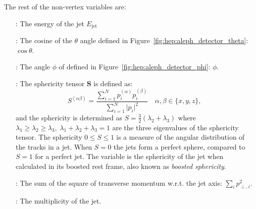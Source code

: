 \documentclass[a4paper, twoside, nobib]{tufte-book}
\newcommand{\abs}[1]{\lvert#1\rvert}
\newcommand{\code}[1]{\colorbox{light-gray}{\texttt{\detokenize{#1}}}}
\renewcommand{\vec}[1]{\mathbf{#1}}
\begin{document}


 


The rest of the non-vertex variables are: 

\begin{enumerate}
  \item[\hspace{0.5cm} \code{ejet}:] The energy of the jet $E_\mathrm{jet}$
  
  \item[\hspace{0.5cm} \code{costheta}:] The cosine of the $\theta$ angle defined in Figure~\ref{fig:hep:aleph_detector_theta}: $\cos \theta$.
  
  \item[\hspace{0.5cm} \code{phijet}:] The angle $\phi$ of defined in Figure~\ref{fig:hep:aleph_detector_phi}: $\phi$. 
  
  \item[\hspace{0.5cm} \code{sphjet}:] The sphericity tensor $\vec{S}$ is defined as:
    \begin{equation}
      S^{(\alpha\beta)} = \frac{\sum_{i=1}^N p_i^{(\alpha)}p_i^{(\beta)}}{\sum_{i=1}^N \abs{p_i}^2} \quad \alpha, \beta \in \{x, y, z\},
    \end{equation}
    and the sphericity is determined as $S=\frac{3}{2}(\lambda_2 + \lambda_3)$ where $\lambda_1 \ge \lambda_2 \ge \lambda_3, \; \lambda_1 + \lambda_2+\lambda_3=1$ are the three eigenvalues of the sphericity tensor. The sphericity $0 \le S \le 1 $ is a measure of the angular distribution of the tracks in a jet. When $S=0$ the jets form a perfect sphere, compared to $S=1$ for a perfect jet. The \code{sphjet} variable is the sphericity of the jet when calculated in its boosted rest frame, also known as \emph{boosted sphericity}.

  \item[\hspace{0.5cm} \code{pt2jet}:] The sum of the square of transverse momentum w.r.t. the jet axis: $\sum_i p^2_{\perp, i}$.

  \item[\hspace{0.5cm} \code{muljet}:] The multiplicity of the jet. 
\end{enumerate}
\end{document}

